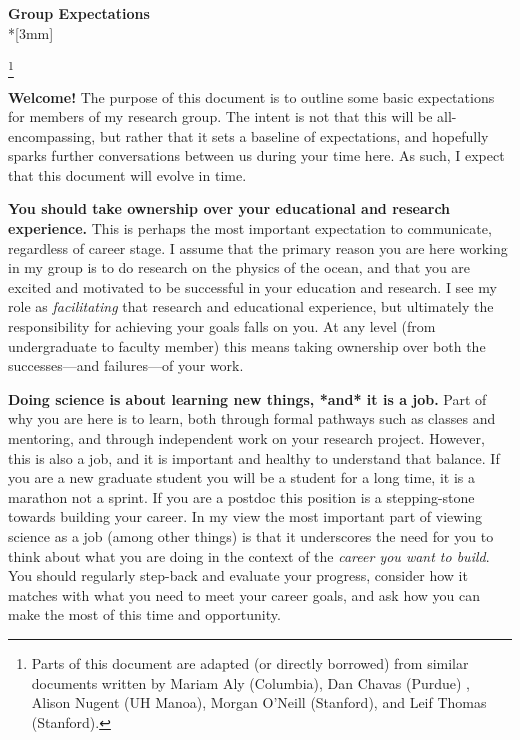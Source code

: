 \documentclass{classassignments}
\newcommand\blfootnote[1]{%
	\begingroup
	\renewcommand\thefootnote{}\footnote{#1}%
	\addtocounter{footnote}{-1}%
	\endgroup
}
\begin{document}

\begin{center}
	{\Large{\bf Group Expectations}}\\*[3mm]
\end{center}
\blfootnote{Parts of this document are adapted (or directly borrowed) from similar documents written by Mariam Aly (Columbia), Dan Chavas (Purdue) , Alison Nugent (UH Manoa), Morgan O'Neill (Stanford), and Leif Thomas (Stanford).}
\textbf{Welcome!} The purpose of this document is to outline some basic expectations for members of my research group. The intent is not that this will be all-encompassing, but rather that it sets a baseline of expectations, and hopefully sparks further conversations between us during your time here. As such, I expect that this document will evolve in time.\bigskip

\textbf{You should take ownership over your educational and research experience.} This is perhaps the most important expectation to communicate, regardless of career stage. I assume that the primary reason you are here working in my group is to do research on the physics of the ocean, and that you are excited and motivated to be successful in your education and research. I see my role as \textit{facilitating} that research and educational experience, but ultimately the responsibility for achieving your goals falls on you. At any level (from undergraduate to faculty member) this means taking ownership over both the successes---and failures---of your work.\bigskip

\textbf{Doing science is about learning new things, *and* it is a job.} Part of why you are here is to learn, both through formal pathways such as classes and mentoring, and through independent work on your research project. However, this is also a job, and it is important and healthy to understand that balance. If you are a new graduate student you will be a student for a long time, it is a marathon not a sprint. If you are a postdoc this position is a stepping-stone towards building your career. In my view the most important part of viewing science as a job (among other things) is that it underscores the need for you to think about what you are doing in the context of the \textit{career you want to build}. You should regularly step-back and evaluate your progress, consider how it matches with what you need to meet your career goals, and ask how you can make the most of this time and opportunity. 
\end{document}
